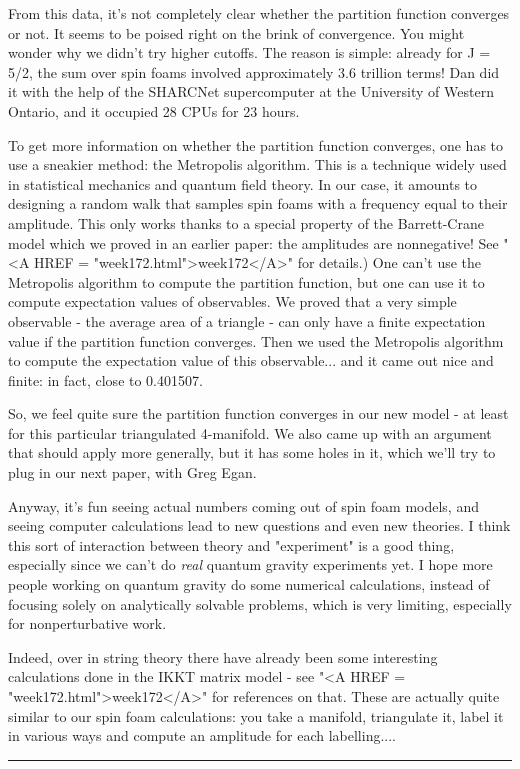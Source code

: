 From this data, it's not completely clear whether the partition function
converges or not.  It seems to be poised right on the brink of convergence.  
You might wonder why we didn't try higher cutoffs.  The reason is simple: 
already for J = 5/2, the sum over spin foams involved approximately 3.6 
trillion terms!  Dan did it with the help of the SHARCNet supercomputer 
at the University of Western Ontario, and it occupied 28 CPUs for 23 hours.

To get more information on whether the partition function converges, one
has to use a sneakier method: the Metropolis algorithm.  This is a
technique widely used in statistical mechanics and quantum field theory.
In our case, it amounts to designing a random walk that samples spin
foams with a frequency equal to their amplitude.  This only works thanks
to a special property of the Barrett-Crane model which we proved in an
earlier paper: the amplitudes are nonnegative!  See "<A HREF =
"week172.html">week172</A>" for details.)  One can't use the
Metropolis algorithm to compute the partition function, but one can use
it to compute expectation values of observables.  We proved that a very
simple observable - the average area of a triangle - can only have a
finite expectation value if the partition function converges.  Then we
used the Metropolis algorithm to compute the expectation value of this
observable... and it came out nice and finite: in fact, close to
0.401507.

So, we feel quite sure the partition function converges in our new model - 
at least for this particular triangulated 4-manifold.  We also came up
with an argument that should apply more generally, but it has some 
holes in it, which we'll try to plug in our next paper, with Greg Egan.

Anyway, it's fun seeing actual numbers coming out of spin foam models,
and seeing computer calculations lead to new questions and even new
theories.  I think this sort of interaction between theory and
"experiment" is a good thing, especially since we can't do
\emph{real} quantum gravity experiments yet.  I hope more people
working on quantum gravity do some numerical calculations, instead of
focusing solely on analytically solvable problems, which is very
limiting, especially for nonperturbative work.

Indeed, over in string theory there have already been some interesting
calculations done in the IKKT matrix model - see "<A HREF =
"week172.html">week172</A>" for references on that.  These are
actually quite similar to our spin foam calculations: you take a
manifold, triangulate it, label it in various ways and compute an
amplitude for each labelling....


 \par\noindent\rule{\textwidth}{0.4pt}

